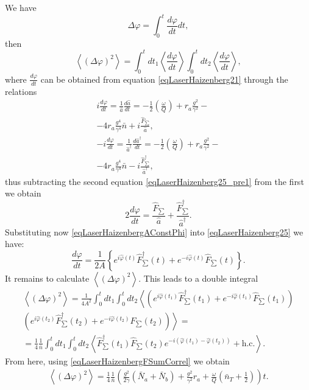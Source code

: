 We have
\[
\Delta \varphi = \int_0^t \frac{d \varphi}{d t}dt,
\]
then
\[
\left<\left(\Delta \varphi\right)^2\right> = \int_0^t d t_1 \left<\frac{d \varphi}{d t}\right>
\int_0^{t} d t_2 \left<\frac{d \varphi}{d t}\right>,
\]
where $\frac{d \varphi}{d t}$ can be obtained from equation
\eqref{eqLaserHaizenberg21} through the relations
\begin{eqnarray}
i \frac{d \varphi}{d t} = \frac{1}{\hat{a}}\frac{d
  \hat{a}}{d t} = 
-\frac{1}{2}\left(\frac{\omega}{Q}\right)
+ r_a \frac{g^2}{\gamma^2} - 
\nonumber \\
- 4 r_a\frac{g^4}{\gamma^4} \bar{n} + i \frac{\hat{F}_{\sum}}{\hat{a}},
\nonumber \\
- i \frac{d \varphi}{d t} = \frac{1}{\hat{a}^{\dag}}\frac{d
  \hat{a}^{\dag}}{d t} = 
-\frac{1}{2}\left(\frac{\omega}{Q}\right)
+ r_a \frac{g^2}{\gamma^2} - 
\nonumber \\
- 4 r_a\frac{g^4}{\gamma^4} \bar{n} - i \frac{\hat{F}^{\dag}_{\sum}}{\hat{a}^{\dag}},
\label{eqLaserHaizenberg25_pre1}
\end{eqnarray}
thus subtracting the second equation \eqref{eqLaserHaizenberg25_pre1} from
the first we obtain
\begin{equation}
2 \frac{d \varphi}{d t} = 
\frac{\hat{F}_{\sum}}{\hat{a}} + \frac{\hat{F}^{\dag}_{\sum}}{\hat{a}^{\dag}}.
\label{eqLaserHaizenberg25}
\end{equation}
Substituting now \eqref{eqLaserHaizenbergAConstPhi} into
\eqref{eqLaserHaizenberg25} 
we have:
\begin{equation}
\frac{d \varphi}{d t} = \frac{1}{2 A}
\left\{
e^{i\hat{\varphi}\left(t\right)}\hat{F}^{\dag}_{\sum}\left(t\right) +
e^{- i\hat{\varphi}\left(t\right)}\hat{F}_{\sum}\left(t\right)
\right\}.
\nonumber
\end{equation}
It remains to calculate  
\(
\left<\left(\Delta \varphi\right)^2\right>.
\)
This leads to a double integral
\begin{eqnarray}
\left<\left(\Delta \varphi\right)^2\right> = 
\frac{1}{4 A^2}
\int_0^t d t_1 
\int_0^t d t_2
\left<
\left(
e^{i\hat{\varphi}\left(t_1\right)}\hat{F}^{\dag}_{\sum}\left(t_1\right) + 
e^{- i\hat{\varphi}\left(t_1\right)}\hat{F}_{\sum}\left(t_1\right)
\right)\right.
\nonumber \\
\left.
\left(
e^{i\hat{\varphi}\left(t_2\right)}\hat{F}^{\dag}_{\sum}\left(t_2\right) +
e^{- i\hat{\varphi}\left(t_2\right)}\hat{F}_{\sum}\left(t_2\right)
\right)
\right> = 
\nonumber \\
=
\frac{1}{4}\frac{1}{\bar{n}}
\int_0^t d t_1 
\int_0^t d t_2
\left<
\hat{F}^{\dag}_{\sum}\left(t_1\right)\hat{F}_{\sum}\left(t_2\right)e^{-i\left(
\hat{\varphi}\left(t_1\right) - \hat{\varphi}\left(t_2\right)
\right)} + \mbox{h.c.}\right>.
\nonumber
\end{eqnarray}
From here, using \eqref{eqLaserHaizenbergFSumCorrel} we obtain
\begin{eqnarray}
\left<\left(\Delta \varphi\right)^2\right> = 
\frac{1}{4}\frac{1}{\bar{n}}
\left(
\frac{g^2}{2\gamma}\left(\bar{N}_a + \bar{N}_b\right) + \frac{g^2}{\gamma^2}r_a + 
\frac{\omega}{Q}\left(\bar{n}_T + \frac{1}{2}\right)
\right) t.
\label{eqLaserHaizenbergTaskDelta}
\end{eqnarray}

